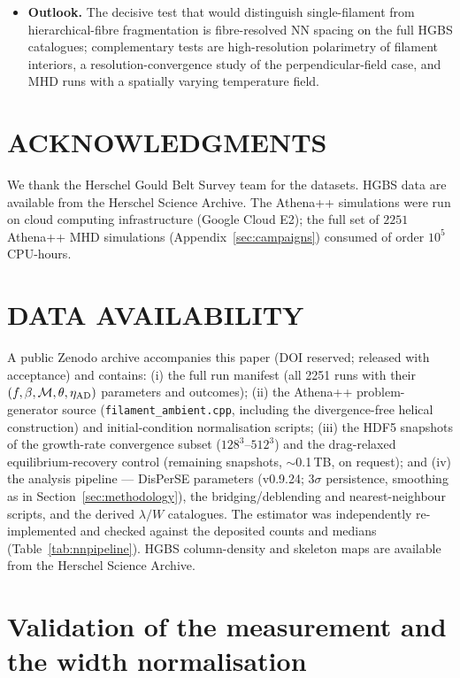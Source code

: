 \documentclass[usenatbib,twoside,twocolumn]{mnras}
\begin{document}
\begin{itemize}
    \item \textbf{Outlook.} The decisive test that would distinguish single-filament from hierarchical-fibre fragmentation is fibre-resolved NN spacing on the full HGBS catalogues; complementary tests are high-resolution polarimetry of filament interiors, a resolution-convergence study of the perpendicular-field case, and MHD runs with a spatially varying temperature field.
    \end{itemize}

\section*{ACKNOWLEDGMENTS}

We thank the Herschel Gould Belt Survey team for the datasets. HGBS data are available from the Herschel Science Archive. The Athena++ simulations were run on cloud computing infrastructure (Google Cloud E2); the full set of $2251$ Athena++ MHD simulations (Appendix~\ref{sec:campaigns}) consumed of order $10^5$ CPU-hours.

\section*{DATA AVAILABILITY}

A public Zenodo archive accompanies this paper (DOI reserved; released with acceptance) and contains: (i) the full run manifest (all 2251 runs with their $(f,\beta,\mathcal{M},\theta,\eta_{\rm AD})$ parameters and outcomes); (ii) the Athena++ problem-generator source (\texttt{filament\_ambient.cpp}, including the divergence-free helical construction) and initial-condition normalisation scripts; (iii) the HDF5 snapshots of the growth-rate convergence subset ($128^3$--$512^3$) and the drag-relaxed equilibrium-recovery control (remaining snapshots, $\sim$0.1\,TB, on request); and (iv) the analysis pipeline --- DisPerSE parameters (v0.9.24; $3\sigma$ persistence, smoothing as in Section~\ref{sec:methodology}), the bridging/deblending and nearest-neighbour scripts, and the derived $\lambda/W$ catalogues. The estimator was independently re-implemented and checked against the deposited counts and medians (Table~\ref{tab:nnpipeline}). HGBS column-density and skeleton maps are available from the Herschel Science Archive.


\appendix

\section{Validation of the measurement and the width normalisation}
\label{sec:val_appendix}
\end{document}
